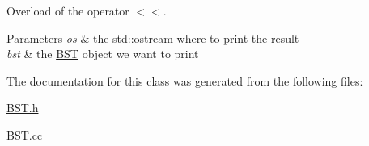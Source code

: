 Overload of the operator $<$$<$. 


\begin{DoxyParams}{Parameters}
{\em os} & the std\+::ostream where to print the result \\
\hline
{\em bst} & the \hyperlink{classBST}{B\+ST} object we want to print \\
\hline
\end{DoxyParams}


The documentation for this class was generated from the following files\+:\begin{DoxyCompactItemize}
\item 
\hyperlink{BST_8h}{B\+S\+T.\+h}\item 
B\+S\+T.\+cc\end{DoxyCompactItemize}
